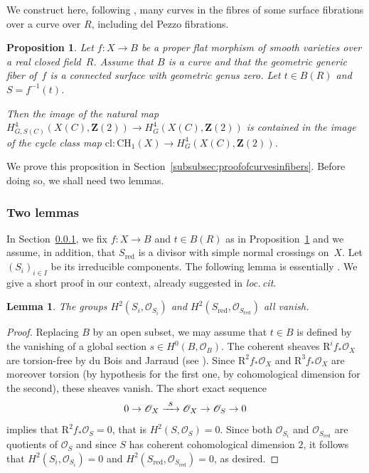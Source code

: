 \documentclass[JEP,XML,SOM,Unicode]{cedram}
\newcommand{\To}[1]{\mathchoice{\xrightarrow{\textstyle\kern4pt#1\kern3pt}}{\stackrel{#1}{\longrightarrow}}{}{}}
\theoremstyle{plain}
\newtheorem{lem}[thm]{Lemma}
\newtheorem{prop}[thm]{Proposition}
\theoremstyle{definition}
\numberwithin{equation}{section}
\newcommand{\cl}{{\mathrm{cl}}}
\newcommand{\sO}{{\mathscr O}}
\newcommand{\Z}{{\mathbf Z}}
\newcommand{\CH}{\mathrm{CH}}
\newcommand{\red}{{\mathrm{red}}}
\newcommand{\RR}{{\mathrm{R}}}
\begin{document}
We construct here, following \cite{ewzcl}, many curves in the fibres of some surface fibrations over a curve over $R$, including del Pezzo fibrations.

\begin{prop}
\label{prop:curvesinfibers}
Let $f:X\to B$ be a proper flat morphism of smooth varieties over a real closed field~$R$.
Assume that $B$ is a curve
and that the geometric generic fiber of~$f$ is a connected surface with geometric genus zero.
Let $t\in B(R)$ and $S=f^{-1}(t)$.

Then the image of the natural map $H^4_{G,S(C)}(X(C),\Z(2))\to H^4_G(X(C),\Z(2))$ is contained in the image of the cycle class map $\cl:\CH_1(X)\to H^4_G(X(C),\Z(2))$.
\end{prop}

We prove this proposition in Section~\ref{subsubsec:proofofcurvesinfibers}.
Before doing so, we shall need two lemmas.

\subsubsection{Two lemmas}
\label{subsubsec:afewlemmas}

In Section~\ref{subsubsec:afewlemmas}, we fix $f:X\to B$ and $t\in B(R)$ as in Proposition~\ref{prop:curvesinfibers} and we assume, in addition, that $S_\red$ is a divisor with simple normal
crossings on~$X$.
Let $(S_i)_{i\in I}$ be its irreducible components.
The following lemma is essentially \cite[Lem.\,4.4, 4.5]{ewzcl}. We give a short proof in our context, already suggested in \emph{loc.\,cit}.

\begin{lem}\label{vanishingH2}
The groups $H^2(S_i,\sO_{S_i})$ and $H^2(S_{\red},\sO_{S_{\red}})$ all vanish.
\end{lem}

\begin{proof}
Replacing $B$ by an open subset, we may assume that $t\in B$ is defined by the vanishing of a global section $s\in H^0(B,\sO_B)$.
The coherent sheaves $\RR^if_*\sO_{X}$ are torsion-free
by du Bois and Jarraud \cite{duboisjarraud}
(see \cite[Step~6 p.\,20]{kollartorsionfree}).
Since $\RR^2 f_*\sO_{X}$ and $\RR^3 f_*\sO_{X}$ are moreover torsion (by hypothesis for the first one, by cohomological dimension for the second), these sheaves vanish.
The short exact sequence
\[
0\to \sO_{X}\To{s}\sO_{X}\to \sO_S\to 0
\]
implies that $\RR^2 f_*\sO_S=0$, that is $H^2(S,\sO_S)=0$.
Since both $\sO_{S_i}$ and $\sO_{S_{\red}}$ are quotients of $\sO_S$ and since $S$ has coherent cohomological dimension $2$, it follows that
$H^2(S_i,\sO_{S_i})=0$ and $H^2(S_{\red},\sO_{S_{\red}})=0$, as desired.
\end{proof}
\end{document}
